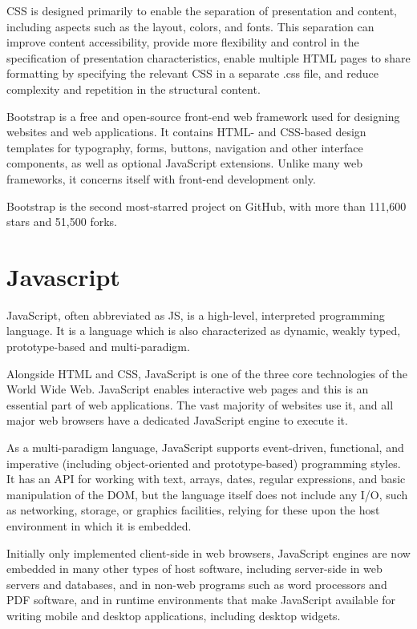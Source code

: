 CSS is designed primarily to enable the separation of presentation and content, including aspects such as the layout, colors, and fonts. This separation can improve content accessibility, provide more flexibility and control in the specification of presentation characteristics, enable multiple HTML pages to share formatting by specifying the relevant CSS in a separate .css file, and reduce complexity and repetition in the structural content.

Bootstrap is a free and open-source front-end web framework used for  designing websites and web applications. It contains HTML- and CSS-based design templates for typography, forms, buttons, navigation and other interface components, as well as optional JavaScript extensions. Unlike many web frameworks, it concerns itself with front-end development only.

Bootstrap is the second most-starred project on GitHub, with more than 111,600 stars and 51,500 forks.
\section{Javascript}
JavaScript, often abbreviated as JS, is a high-level, interpreted programming language. It is a language which is also characterized as dynamic, weakly typed, prototype-based and multi-paradigm.

Alongside HTML and CSS, JavaScript is one of the three core technologies of the World Wide Web. JavaScript enables interactive web pages and this is an essential part of web applications. The vast majority of websites use it, and all major web browsers have a dedicated JavaScript engine to execute it.

As a multi-paradigm language, JavaScript supports event-driven, functional, and imperative (including object-oriented and prototype-based) programming styles. It has an API for working with text, arrays, dates, regular expressions, and basic manipulation of the DOM, but the language itself does not include any I/O, such as networking, storage, or graphics facilities, relying for these upon the host environment in which it is embedded.

Initially only implemented client-side in web browsers, JavaScript engines are now embedded in many other types of host software, including server-side in web servers and databases, and in non-web programs such as word processors and PDF software, and in runtime environments that make JavaScript available for writing mobile and desktop applications, including desktop widgets.

